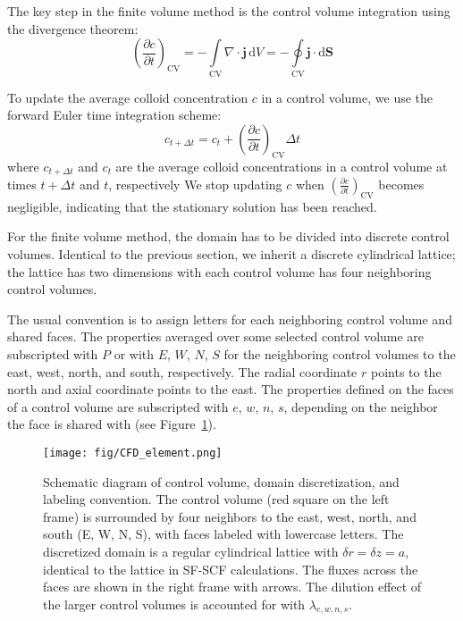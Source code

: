 \documentclass[10pt, a4paper]{article}
\begin{document}
\begin{multicols}{2}
The key step in the finite volume method is the control volume integration using the divergence theorem:
\begin{equation}
    \label{eq:CFD_integration_1}
    \left( \frac{\partial c}{\partial t} \right)_{\text{CV}} = -\int\limits_{\text{CV}} \nabla \cdot \bm{j} \, \text{d}V = -\oint\limits_{\text{CV}} \bm{j} \cdot \text{d}\bm{S}
\end{equation}

To update the average colloid concentration $c$ in a control volume, we use the forward Euler time integration scheme:
\begin{equation}
    c_{t + \Delta t} = c_t + \left( \frac{\partial c}{\partial t} \right)_{\text{CV}} \Delta t
\end{equation}
where $c_{t + \Delta t}$ and $c_t$ are the average colloid concentrations in a control volume at times $t + \Delta t$ and $t$, respectively
We stop updating $c$ when $\left( \frac{\partial c}{\partial t} \right)_{\text{CV}}$ becomes negligible, indicating that the stationary solution has been reached.

For the finite volume method, the domain has to be divided into discrete control volumes.
Identical to the previous section, we inherit a discrete cylindrical lattice; the lattice has two dimensions with each control volume has four neighboring control volumes.

The usual convention is to assign letters for each neighboring control volume and shared faces.
The properties averaged over some selected control volume are subscripted with $P$ or with $E$, $W$, $N$, $S$ for the neighboring control volumes to the east, west, north, and south, respectively.
The radial coordinate $r$ points to the north and axial coordinate points to the east.
The properties defined on the faces of a control volume are subscripted with $e$, $w$, $n$, $s$, depending on the neighbor the face is shared with (see Figure~\ref{fig:CFD_element}).


\begin{figure}[H]
    \centering
    \texttt{[image: fig/CFD\_element.png]}
    \caption{
        Schematic diagram of control volume, domain discretization, and labeling convention.
        The control volume (red square on the left frame) is surrounded by four neighbors to the east, west, north, and south (E, W, N, S), with faces labeled with lowercase letters.
        The discretized domain is a regular cylindrical lattice with $\delta r = \delta z = a$, identical to the lattice in SF-SCF calculations.
        The fluxes across the faces are shown in the right frame with arrows.
        The dilution effect of the larger control volumes is accounted for with $\lambda_{e,w,n,s}$.
        }
    \label{fig:CFD_element}
\end{figure}


\end{multicols}
\end{document}
